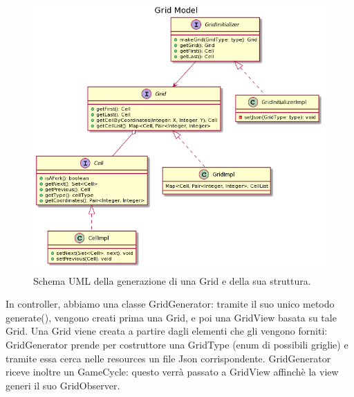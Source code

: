 \documentclass[a4paper,12pt]{report}
\begin{document}
	\begin{figure}[h]
		\centering{}
		\includegraphics[width=\textwidth]{images/miriana/grid_model.png}
		\caption{Schema UML della generazione di una Grid e della sua struttura.}
		\label{img:gridmodel}
	\end{figure}

	In controller, abbiamo una classe GridGenerator: tramite il suo unico metodo generate(), vengono creati prima una Grid, e poi una GridView basata su tale Grid.
	Una Grid viene creata a partire dagli elementi che gli vengono forniti: GridGenerator prende per costruttore una GridType (enum di possibili griglie) e tramite essa cerca nelle resources un file Json corrispondente.
	GridGenerator riceve inoltre un GameCycle: questo verrà passato a GridView affinchè la view generi il suo GridObserver.
\end{document}
